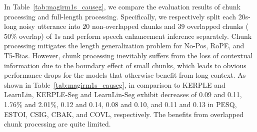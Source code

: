 \documentclass[journal]{IEEEtran}
\begin{document}
In Table~\ref{tab:magirm1s_causeg}, we compare the evaluation results of chunk processing and full-length processing. Specifically, we respectively split each 20s-long noisy utterance into $20$ non-overlapped chunks and $39$ overlapped chunks ($50\%$ overlap) of 1s and perform speech enhancement inference separately. Chunk processing mitigates the length generalization problem for No-Pos, RoPE, and T5-Bias. However, chunk processing inevitably suffers from the loss of contextual information due to the boundary effect of small chunks, which leads to obvious performance drops for the models that otherwise benefit from long context. As shown in Table~\ref{tab:magirm1s_causeg}, in comparison to KERPLE and LearnLin, KERPLE-Seg and LearnLin-Seg exhibit decreases of 0.09 and 0.11, 1.76\% and 2.01\%, 0.12 and 0.14, 0.08 and 0.10, and 0.11 and 0.13 in PESQ, ESTOI, CSIG, CBAK, and COVL, respectively. The benefits from overlapped chunk processing are quite limited.



\end{document}
